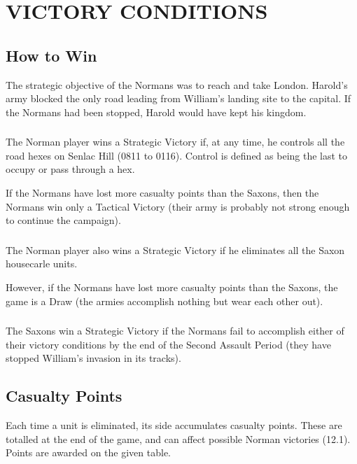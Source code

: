 \section{VICTORY CONDITIONS}

\subsection{How to Win}

The strategic objective of the Normans was to reach and take London. Harold's army blocked the only road leading from William's landing site to the capital. If the Normans had been stopped, Harold would have kept his kingdom.

\subsubsection[Norman Victory]{} The Norman player wins a Strategic Victory if, at any time, he controls all the road hexes on Senlac Hill (0811 to 0116). Control is defined as being the last to occupy or pass through a hex.

If the Normans have lost more casualty points than the Saxons, then the Normans win only a Tactical Victory (their army is probably not strong enough to continue the campaign).

\subsubsection[Norman Victory Alt]{} The Norman player also wins a Strategic Victory if he eliminates all the Saxon housecarle units.

However, if the Normans have lost more casualty points than the Saxons, the game is a Draw (the armies accomplish nothing but wear each other out).

\subsubsection[Saxon Victory]{} The Saxons win a Strategic Victory if the Normans fail to accomplish either of their victory conditions by the end of the Second Assault Period (they have stopped William's invasion in its tracks).

\subsection{Casualty Points}

Each time a unit is eliminated, its side accumulates casualty points. These are totalled at the end of the game, and can affect possible Norman victories (12.1). Points are awarded on the given table.

